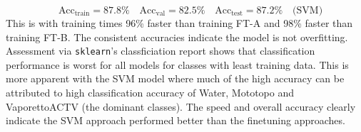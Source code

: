\documentclass[11pt,a4paper]{article}
\begin{document}
\begin{equation*}
    \quad\text{Acc}_\text{train} = 87.8\% \quad \text{Acc}_\text{val} = 82.5\% \quad \text{Acc}_\text{test} = 87.2\% \quad \text{(SVM)}
\end{equation*}
This is with training times 96\% faster than training FT-A and 98\% faster than training FT-B.
The consistent accuracies indicate the model is not overfitting. Assessment via \texttt{sklearn}'s classficiation report shows that classification performance is worst for all models for classes with least training data. This is more apparent with the SVM model where much of the high accuracy can be attributed to high classification accuracy of Water, Mototopo and VaporettoACTV (the dominant classes). The speed and overall accuracy clearly indicate the SVM approach performed better than the finetuning approaches.
\end{document}
